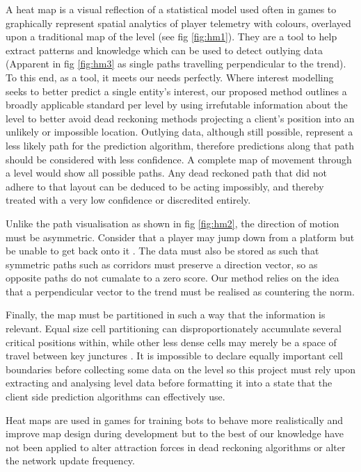 \documentclass[journal]{IEEEtran}
\begin{document}
A heat map is a visual reflection of a statistical model \cite{wilkinson2009history} used often in games to graphically represent spatial analytics of player telemetry with colours, overlayed upon a traditional map of the level (see fig \ref{fig:hm1}). They are a tool to help extract patterns and knowledge which can be used to detect outlying data \cite{drachen2013spatial} (Apparent in fig \ref{fig:hm3} as single paths travelling perpendicular to the trend). To this end, as a tool, it meets our needs perfectly. Where interest modelling seeks to better predict a single entity's interest,
our proposed method outlines a broadly applicable standard per level by using irrefutable information about the level to better avoid dead reckoning methods projecting a client's position into an unlikely or impossible location. Outlying data, although still possible, represent a less likely path for the prediction algorithm, therefore predictions along that path should be considered with less confidence. A complete map of movement through a level would show all possible paths. Any dead reckoned path that did not adhere to that layout can be deduced to be acting impossibly, and thereby treated with a very low confidence or discredited entirely.

Unlike the path visualisation as shown in fig \ref{fig:hm2}, the direction of motion must be asymmetric. Consider that a player may jump down from a platform but be unable to get back onto it \cite{bauckhage2014beyond}. The data must also be stored as such that symmetric paths such as corridors must preserve a direction vector, so as opposite paths do not cumalate to a zero score. Our method relies on the idea that a perpendicular vector to the trend must be realised as countering the norm.

Finally, the map must be partitioned in such a way that the information is relevant. Equal size cell partitioning can disproportionately accumulate several critical positions within, while other less dense cells may merely be a space of travel between key junctures \cite{steed2003partitioning}. It is impossible to declare equally important cell boundaries before collecting some data on the level so this project must rely upon extracting and analysing level data before formatting it into a state that the client side prediction algorithms can effectively use.

Heat maps are used in games for training bots to behave more realistically and improve map design during development \cite{bauckhage2014beyond} but to the best of our knowledge have not been applied to alter attraction forces in dead reckoning algorithms or alter the network update frequency.
\end{document}
